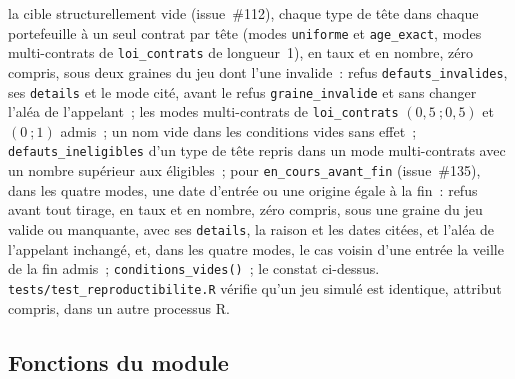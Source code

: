 \documentclass[a4paper,11pt]{article}
\newcommand{\code}[1]{\texttt{\small #1}}
\begin{document}
la cible structurellement vide (issue~\#112), chaque type de tête dans
chaque portefeuille à un seul contrat par tête (modes \code{uniforme} et
\code{age\_exact}, modes multi-contrats de \code{loi\_contrats} de
longueur~1), en taux et en nombre, zéro compris, sous deux graines du jeu
dont l'une invalide~: refus \code{defauts\_invalides}, ses \code{details}
et le mode cité, avant le refus \code{graine\_invalide} et sans changer
l'aléa de l'appelant~; les modes multi-contrats de \code{loi\_contrats}
$(0{,}5~; 0{,}5)$ et $(0~; 1)$ admis~; un nom vide dans les conditions
vides sans effet~; \code{defauts\_ineligibles} d'un type de tête repris
dans un mode multi-contrats avec un nombre supérieur aux éligibles~; pour
\code{en\_cours\_avant\_fin} (issue~\#135), dans les quatre modes, une
date d'entrée ou une origine égale à la fin~: refus avant tout tirage, en
taux et en nombre, zéro compris, sous une graine du jeu valide ou
manquante, avec ses \code{details}, la raison et les dates citées, et
l'aléa de l'appelant inchangé, et, dans les quatre modes, le cas voisin
d'une entrée la veille de la fin admis~; \code{conditions\_vides()}~; le
constat ci-dessus.
\code{tests/test\_reproductibilite.R} vérifie qu'un jeu simulé est
identique, attribut compris, dans un autre processus R.

\subsection{Fonctions du module}
\label{sec:fonctions-simulation}
\end{document}
